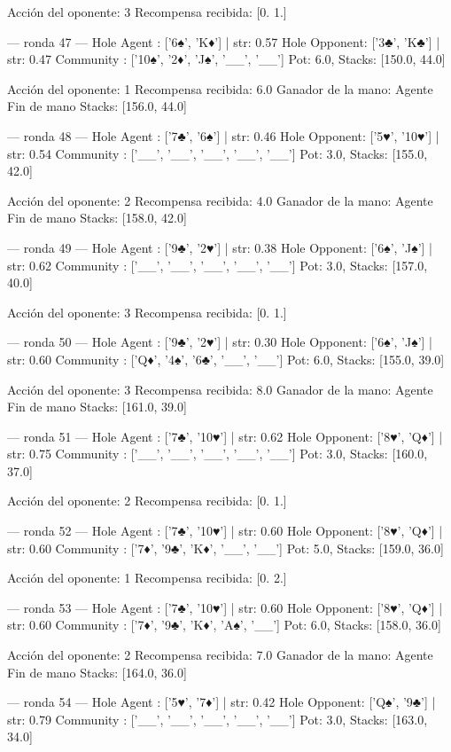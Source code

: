 Acción del oponente: 3
Recompensa recibida: [0. 1.]

--- ronda 47 ---
Hole Agent : ['6♠', 'K♦'] | str: 0.57
Hole Opponent: ['3♣', 'K♣'] | str: 0.47
Community  : ['10♠', '2♦', 'J♠', '__', '__']
Pot: 6.0, Stacks: [150.0, 44.0]

Acción del oponente: 1
Recompensa recibida: 6.0
Ganador de la mano: Agente
Fin de mano Stacks: [156.0, 44.0]


--- ronda 48 ---
Hole Agent : ['7♣', '6♠'] | str: 0.46
Hole Opponent: ['5♥', '10♥'] | str: 0.54
Community  : ['__', '__', '__', '__', '__']
Pot: 3.0, Stacks: [155.0, 42.0]

Acción del oponente: 2
Recompensa recibida: 4.0
Ganador de la mano: Agente
Fin de mano Stacks: [158.0, 42.0]


--- ronda 49 ---
Hole Agent : ['9♣', '2♥'] | str: 0.38
Hole Opponent: ['6♠', 'J♠'] | str: 0.62
Community  : ['__', '__', '__', '__', '__']
Pot: 3.0, Stacks: [157.0, 40.0]

Acción del oponente: 3
Recompensa recibida: [0. 1.]

--- ronda 50 ---
Hole Agent : ['9♣', '2♥'] | str: 0.30
Hole Opponent: ['6♠', 'J♠'] | str: 0.60
Community  : ['Q♦', '4♠', '6♣', '__', '__']
Pot: 6.0, Stacks: [155.0, 39.0]

Acción del oponente: 3
Recompensa recibida: 8.0
Ganador de la mano: Agente
Fin de mano Stacks: [161.0, 39.0]


--- ronda 51 ---
Hole Agent : ['7♣', '10♥'] | str: 0.62
Hole Opponent: ['8♥', 'Q♦'] | str: 0.75
Community  : ['__', '__', '__', '__', '__']
Pot: 3.0, Stacks: [160.0, 37.0]

Acción del oponente: 2
Recompensa recibida: [0. 1.]

--- ronda 52 ---
Hole Agent : ['7♣', '10♥'] | str: 0.60
Hole Opponent: ['8♥', 'Q♦'] | str: 0.60
Community  : ['7♦', '9♣', 'K♦', '__', '__']
Pot: 5.0, Stacks: [159.0, 36.0]

Acción del oponente: 1
Recompensa recibida: [0. 2.]

--- ronda 53 ---
Hole Agent : ['7♣', '10♥'] | str: 0.60
Hole Opponent: ['8♥', 'Q♦'] | str: 0.60
Community  : ['7♦', '9♣', 'K♦', 'A♠', '__']
Pot: 6.0, Stacks: [158.0, 36.0]

Acción del oponente: 2
Recompensa recibida: 7.0
Ganador de la mano: Agente
Fin de mano Stacks: [164.0, 36.0]


--- ronda 54 ---
Hole Agent : ['5♥', '7♦'] | str: 0.42
Hole Opponent: ['Q♠', '9♣'] | str: 0.79
Community  : ['__', '__', '__', '__', '__']
Pot: 3.0, Stacks: [163.0, 34.0]

